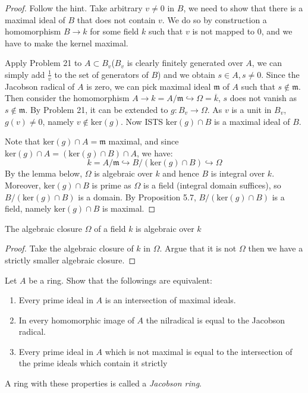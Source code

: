 \documentclass{solution}
\begin{document}
\begin{proof}
    Follow the hint. Take arbitrary $v \ne 0$ in $B$, we need to show that there is a maximal ideal of $B$ that does not contain $v$. We do so by construction a homomorphism $B \rightarrow k$ for some field $k$ such that $v$ is not mapped to $0$, and we have to make the kernel maximal.

    Apply Problem 21 to $A \subset B_v$($B_v$ is clearly finitely generated over $A$, we can simply add $\frac{1}{v}$ to the set of generators of $B$) and we obtain $s \in A, s \ne 0$. Since the Jacobson radical of $A$ is zero, we can pick maximal ideal $\mathfrak{m}$ of $A$ such that $s \notin \mathfrak{m}$. Then consider the homomorphism $A \rightarrow k = A / \mathfrak{m} \hookrightarrow \Omega = \overline{k}$, $s$ does not vanish as $s \notin \mathfrak{m}$. By Problem 21, it can be extended to $g: B_v \rightarrow \Omega$. As $v$ is a unit in $B_v$, $g(v) \ne 0$, namely $v \notin \mathrm{ker}(g)$. Now ISTS $\mathrm{ker}(g) \cap B$ is a maximal ideal of $B$.
    
    Note that $\mathrm{ker}(g) \cap A = \mathfrak{m}$ maximal, and since $\mathrm{ker}(g) \cap A = (\mathrm{ker}(g) \cap B) \cap A$, we have:
    $$k = A / \mathfrak{m} \hookrightarrow B / (\mathrm{ker}(g) \cap B) \hookrightarrow \Omega$$
    By the lemma below, $\Omega$ is algebraic over $k$ and hence $B$ is integral over $k$. Moreover, $\mathrm{ker}(g) \cap B$ is prime as $\Omega$ is a field (integral domain suffices), so $B / (\mathrm{ker}(g) \cap B)$ is a domain. By Proposition 5.7, $B / (\mathrm{ker}(g) \cap B)$ is a field, namely $\mathrm{ker}(g) \cap B$ is maximal.
\end{proof}

\begin{lemma}
    The algebraic closure $\Omega$ of a field $k$ is algebraic over $k$
\end{lemma}

\begin{proof}
    Take the algebraic closure of $k$ in $\Omega$. Argue that it is not $\Omega$ then we have a strictly smaller algebraic closure.
\end{proof}

\begin{problem}
    Let $A$ be a ring. Show that the followings are equivalent:
    \begin{enumerate}
        \item Every prime ideal in $A$ is an intersection of maximal ideals.
        \item In every homomorphic image of $A$ the nilradical is equal to the Jacobson radical.
        \item Every prime ideal in $A$ which is not maximal is equal to the intersection of the prime ideals which contain it strictly
    \end{enumerate}
    A ring with these properties is called a \textit{Jacobson ring}.
\end{problem}
\end{document}
